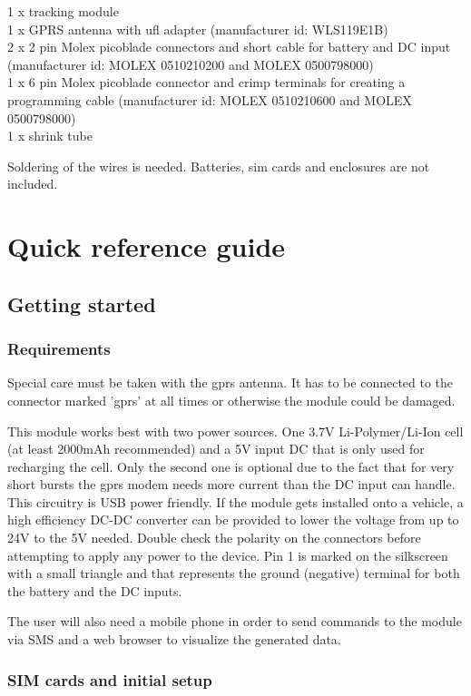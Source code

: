 \documentclass[a4paper,twoside]{refart}
\begin{document}
1 x tracking module \\
1 x GPRS antenna with ufl adapter (manufacturer id: WLS119E1B) \\
2 x 2 pin Molex picoblade connectors and short cable for battery and DC input (manufacturer id: MOLEX 0510210200 and MOLEX 0500798000) \\
1 x 6 pin Molex picoblade connector and crimp terminals for creating a programming cable (manufacturer id: MOLEX 0510210600 and MOLEX 0500798000) \\
1 x shrink tube

Soldering of the wires is needed. Batteries, sim cards and enclosures are not included.

\section{Quick reference guide}

\subsection{Getting started}

\subsubsection{Requirements}

 Special care must be taken with the gprs antenna. It has to be connected to the connector marked 'gprs' at all times or otherwise the module could be damaged.

This module works best with two power sources. One 3.7V Li-Polymer/Li-Ion cell (at least 2000mAh recommended) and a 5V input DC that is only used for recharging the cell. Only the second one is optional due to the fact that for very short bursts the gprs modem needs more current than the DC input can handle. This circuitry is USB power friendly. If the module gets installed onto a vehicle, a high efficiency DC-DC converter can be provided to lower the voltage from up to 24V to the 5V needed. Double check the polarity on the connectors before attempting to apply any power to the device. Pin 1 is marked on the silkscreen with a small triangle and that represents the ground (negative) terminal for both the battery and the DC inputs.

The user will also need a mobile phone in order to send commands to the module via SMS and a web browser to visualize the generated data.

\subsubsection{SIM cards and initial setup}
\end{document}
